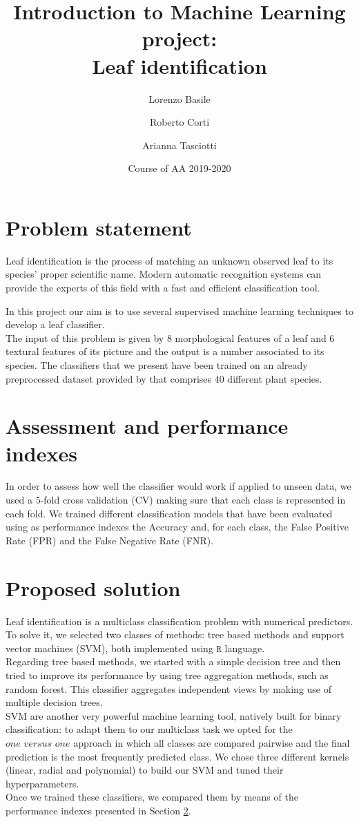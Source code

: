 \documentclass{article}
\title{Introduction to Machine Learning project:\\ Leaf identification}
\author[1]{Lorenzo Basile}
\author[2]{Roberto Corti}
\author[3]{Arianna Tasciotti}
\affil[1,2,3]{
    problem statement,
    solution design,
    solution development,
    writing
}
\date{Course of AA 2019-2020}
\begin{document}
\maketitle



\section{Problem statement}
Leaf identification is the process of matching an unknown observed leaf to its species' proper scientific name. Modern automatic recognition systems can provide the experts of this field with a fast and efficient classification tool. 

In this project our aim is to use several supervised machine learning techniques to develop a leaf classifier. \\
The input of this problem is given by 8 morphological features of a leaf and 6 textural features of its picture and the output is a number associated to its species. The classifiers that we present have been trained on an already preprocessed dataset provided by \cite{silva} that comprises 40 different plant species.

\section{Assessment and performance indexes}\label{2}
In order to assess how well the classifier would work if applied to unseen data, we used a $5$-fold cross validation (CV) making sure that each class is represented in each fold. We trained different classification models that have been evaluated using as performance indexes the Accuracy and, for each class, the False Positive Rate (FPR) and the False Negative Rate (FNR).

\section{Proposed solution}\label{3}
Leaf identification is a multiclass classification problem with numerical predictors. To solve it, we selected two classes of methods: tree based methods and support vector machines (SVM), both implemented using $\texttt{R}$ language.
\\Regarding tree based methods, we started with a simple decision tree and then tried to improve its performance by using tree aggregation methods, such as random forest. This classifier aggregates independent views by making use of multiple decision trees. 
\\SVM are another very powerful machine learning tool, natively built for binary classification: to adapt them to our multiclass task we opted for the $\textit{one versus one}$ approach in which all classes are compared pairwise and the final prediction is the most frequently predicted class. We chose three different kernels (linear, radial and polynomial) to build our SVM and tuned their hyperparameters.
\\Once we trained these classifiers, we compared them by means of the performance indexes presented in Section \ref{2}.
\end{document}
